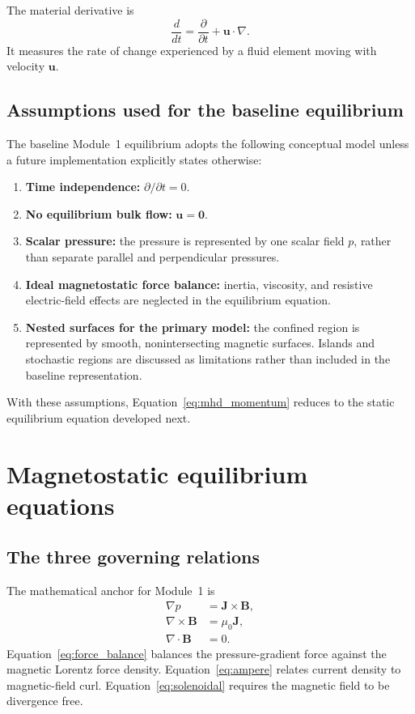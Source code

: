 The material derivative is
\begin{equation}
\frac{d}{dt}=\frac{\partial}{\partial t}+\mathbf u\cdot\nabla.
\end{equation}
It measures the rate of change experienced by a fluid element moving with velocity $\mathbf u$.

\subsection{Assumptions used for the baseline equilibrium}
The baseline Module~1 equilibrium adopts the following conceptual model unless a future implementation explicitly states otherwise:
\begin{enumerate}[leftmargin=1.6em]
\item \textbf{Time independence:} $\partial/\partial t=0$.
\item \textbf{No equilibrium bulk flow:} $\mathbf u=\mathbf 0$.
\item \textbf{Scalar pressure:} the pressure is represented by one scalar field $p$, rather than separate parallel and perpendicular pressures.
\item \textbf{Ideal magnetostatic force balance:} inertia, viscosity, and resistive electric-field effects are neglected in the equilibrium equation.
\item \textbf{Nested surfaces for the primary model:} the confined region is represented by smooth, nonintersecting magnetic surfaces. Islands and stochastic regions are discussed as limitations rather than included in the baseline representation.
\end{enumerate}
With these assumptions, Equation~\eqref{eq:mhd_momentum} reduces to the static equilibrium equation developed next.

\section{Magnetostatic equilibrium equations}
\label{sec:equilibrium_equations}

\subsection{The three governing relations}
The mathematical anchor for Module~1 is
\begin{align}
\nabla p&=\mathbf J\times\mathbf B,
\label{eq:force_balance}\\
\nabla\times\mathbf B&=\mu_0\mathbf J,
\label{eq:ampere}\\
\nabla\cdot\mathbf B&=0.
\label{eq:solenoidal}
\end{align}
Equation~\eqref{eq:force_balance} balances the pressure-gradient force against the magnetic Lorentz force density. Equation~\eqref{eq:ampere} relates current density to magnetic-field curl. Equation~\eqref{eq:solenoidal} requires the magnetic field to be divergence free.

